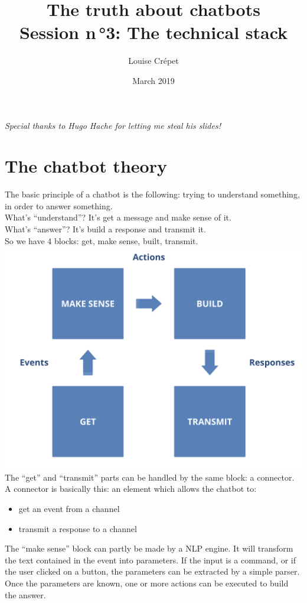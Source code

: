 \documentclass{article}
\title{The truth about chatbots \\[0.4em]\smaller{}Session n\,°3: The technical stack}
\author{Louise Crépet}
\date{March 2019}
\begin{document}
\maketitle

\textit{Special thanks to Hugo Hache for letting me steal his slides!}

\newpage
\section{The chatbot theory}
The basic principle of a chatbot is the following: trying to understand something, in order to answer something. \\
What’s “understand”? It’s get a message and make sense of it.\\
What’s “answer”? It’s build a response and transmit it.\\
\newline
So we have 4 blocks: get, make sense, built, transmit.\\

\includegraphics[scale=0.4]{images/chatbot_blocks.png}
\newline
The “get” and “transmit” parts can be handled by the same block: a connector. A connector is basically this: an element which allows the chatbot to:
\begin{itemize}
    \item get an event from a channel 
    \item transmit a response to a channel
\end{itemize}

The “make sense” block can partly be made by a NLP engine. It will transform the text contained in the event into parameters.
If the input is a command, or if the user clicked on a button, the parameters can be extracted by a simple parser. Once the parameters are known, one or more actions can be executed to build the answer.
\end{document}
